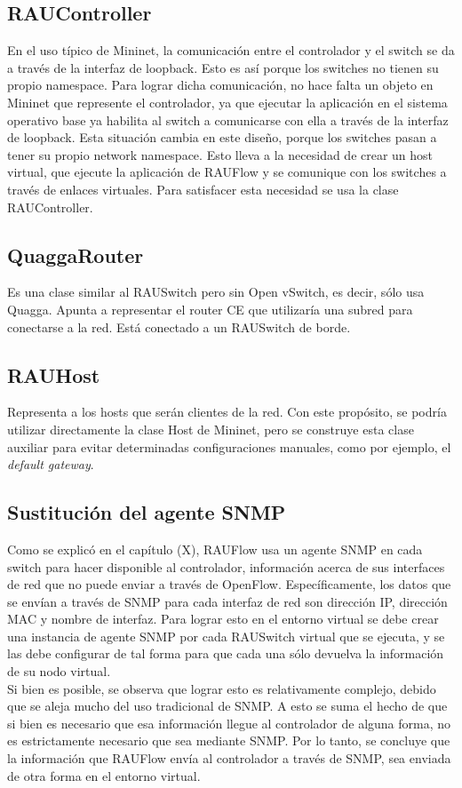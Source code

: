 \subsection{RAUController}
En el uso típico de Mininet, la comunicación entre el controlador y el switch se da a través de la interfaz de loopback. Esto es así porque los switches no tienen su propio namespace. Para lograr dicha comunicación, no hace falta un objeto en Mininet que represente el controlador, ya que ejecutar la aplicación en el sistema operativo base ya habilita al switch a comunicarse con ella a través de la interfaz de loopback. Esta situación cambia en este diseño, porque los switches pasan a tener su propio network namespace. Esto lleva a la necesidad de crear un host virtual, que ejecute la aplicación de RAUFlow y se comunique con los switches a través de enlaces virtuales. Para satisfacer esta necesidad se usa la clase RAUController.

\subsection{QuaggaRouter}
Es una clase similar al RAUSwitch pero sin Open vSwitch, es decir, sólo usa Quagga. Apunta a representar el router CE que utilizaría una subred para conectarse a la red. Está conectado a un RAUSwitch de borde.

\subsection{RAUHost}
Representa a los hosts que serán clientes de la red. Con este propósito, se podría utilizar directamente la clase Host de Mininet, pero se construye esta clase auxiliar para evitar determinadas configuraciones manuales, como por ejemplo, el \textit{default gateway}.

\subsection{Sustitución del agente SNMP}
Como se explicó en el capítulo (X), RAUFlow usa un agente SNMP en cada switch para hacer disponible al controlador, información acerca de sus interfaces de red que no puede enviar a través de OpenFlow. Específicamente, los datos que se envían a través de SNMP para cada interfaz de red son dirección IP, dirección MAC y nombre de interfaz. Para lograr esto en el entorno virtual se debe crear una instancia de agente SNMP por cada RAUSwitch virtual que se ejecuta, y se las debe configurar de tal forma para que cada una sólo devuelva la información de su nodo virtual. \\
Si bien es posible, se observa que lograr esto es relativamente complejo, debido que se aleja mucho del uso tradicional de SNMP. A esto se suma el hecho de que si bien es necesario que esa información llegue al controlador de alguna forma, no es estrictamente necesario que sea mediante SNMP. Por lo tanto, se concluye que la información que RAUFlow envía al controlador a través de SNMP, sea enviada de otra forma en el entorno virtual.

